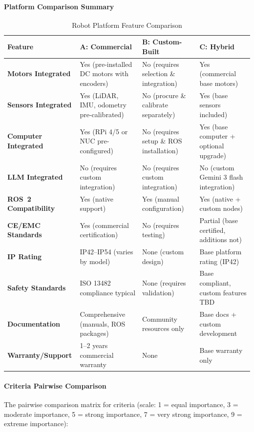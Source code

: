 \paragraph{Platform Comparison Summary}
\begin{table}[H]
\centering
\caption{Robot Platform Feature Comparison}
\small
\begin{tabularx}{\textwidth}{l X X X}
\toprule
\textbf{Feature} & \textbf{A: Commercial} & \textbf{B: Custom-Built} & \textbf{C: Hybrid} \\
\midrule
\textbf{Motors Integrated} & Yes (pre-installed DC motors with encoders) & No (requires selection \& integration) & Yes (commercial base motors) \\
\textbf{Sensors Integrated} & Yes (LiDAR, IMU, odometry pre-calibrated) & No (procure \& calibrate separately) & Yes (base sensors included) \\
\textbf{Computer Integrated} & Yes (RPi 4/5 or NUC pre-configured) & No (requires setup \& ROS installation) & Yes (base computer + optional upgrade) \\
\textbf{LLM Integrated} & No (requires custom integration) & No (requires custom integration) & No (custom Gemini 3 flash integration) \\
\textbf{ROS~2 Compatibility} & Yes (native support) & Yes (manual configuration) & Yes (native + custom nodes) \\
\textbf{CE/EMC Standards} & Yes (commercial certification) & No (requires testing) & Partial (base certified, additions not) \\
\textbf{IP Rating} & IP42--IP54 (varies by model) & None (custom design) & Base platform rating (IP42) \\
\textbf{Safety Standards} & ISO 13482 compliance typical & None (requires validation) & Base compliant, custom features TBD \\
\textbf{Documentation} & Comprehensive (manuals, ROS packages) & Community resources only & Base docs + custom development \\
\textbf{Warranty/Support} & 1--2 years commercial warranty & None & Base warranty only \\
\bottomrule
\end{tabularx}
\end{table}

\paragraph{Criteria Pairwise Comparison}
The pairwise comparison matrix for criteria (scale: 1 = equal importance, 3 = moderate importance, 5 = strong importance, 7 = very strong importance, 9 = extreme importance):

